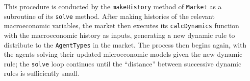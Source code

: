 \message{ !name(ccarroll_et_al_scipy_2018.tex)}\documentclass[10pt,twocolumn]{article}
\let\rmarkdownfootnote\footnote%
\def\footnote{\protect\rmarkdownfootnote}
\begin{document}
This procedure is conducted by the \texttt{makeHistory} method of
\texttt{Market} as a subroutine of its \texttt{solve} method. After
making histories of the relevant macroeconomic variables, the market
then executes its \texttt{calcDynamics} function with the macroeconomic
history as inputs, generating a new dynamic rule to distribute to the
\texttt{AgentTypes} in the market. The process then begins again, with
the agents solving their updated microeconomic models given the new
dynamic rule; the \texttt{solve} loop continues until the ``distance''
between successive dynamic rules is sufficiently small.

\end{document}
